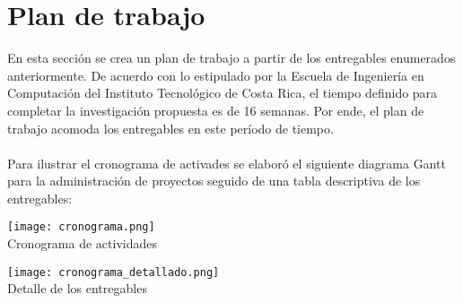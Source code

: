 \section{\textbf{Plan de trabajo}}\label{plan}
En esta secci\'on se crea un plan de trabajo a partir de los entregables enumerados anteriormente. De acuerdo con lo estipulado por la Escuela de Ingenier\'ia en Computaci\'on del Instituto Tecnol\'ogico de Costa Rica, el tiempo definido para completar la investigaci\'on propuesta es de 16 semanas. Por ende, el plan de trabajo acomoda los entregables en este per\'iodo de tiempo.
\\\\
Para ilustrar el cronograma de activades se elabor\'o el siguiente diagrama Gantt para la administraci\'on de proyectos seguido de una tabla descriptiva de los entregables:
\\
\begin{table}[ht]
\centering
\texttt{[image: cronograma.png]}\\
\caption{Cronograma de actividades}
\label{arm:tabla}
\begin{center}
\end{center}
\end{table}

\begin{table}[ht]
\centering
\texttt{[image: cronograma\_detallado.png]}\\
\caption{Detalle de los entregables}
\label{arm:tabla}
\begin{center}
\end{center}
\end{table}
